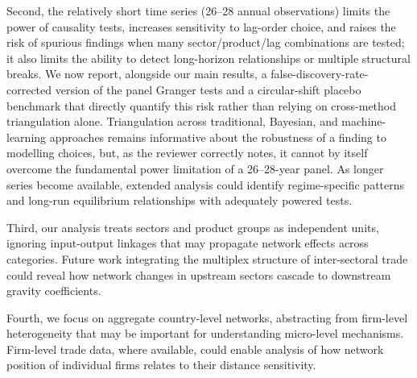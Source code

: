 \documentclass[preprint, 3p,
authoryear]{elsarticle} %
\begin{document}
Second, the relatively short time series (26--28 annual observations)
limits the power of causality tests, increases sensitivity to lag-order
choice, and raises the risk of spurious findings when many
sector/product/lag combinations are tested; it also limits the ability
to detect long-horizon relationships or multiple structural breaks. We
now report, alongside our main results, a false-discovery-rate-corrected
version of the panel Granger tests and a circular-shift placebo
benchmark that directly quantify this risk rather than relying on
cross-method triangulation alone. Triangulation across traditional,
Bayesian, and machine-learning approaches remains informative about the
robustness of a finding to modelling choices, but, as the reviewer
correctly notes, it cannot by itself overcome the fundamental power
limitation of a 26--28-year panel. As longer series become available,
extended analysis could identify regime-specific patterns and long-run
equilibrium relationships with adequately powered tests.

Third, our analysis treats sectors and product groups as independent
units, ignoring input-output linkages that may propagate network effects
across categories. Future work integrating the multiplex structure of
inter-sectoral trade could reveal how network changes in upstream
sectors cascade to downstream gravity coefficients.

Fourth, we focus on aggregate country-level networks, abstracting from
firm-level heterogeneity that may be important for understanding
micro-level mechanisms. Firm-level trade data, where available, could
enable analysis of how network position of individual firms relates to
their distance sensitivity.
\end{document}
